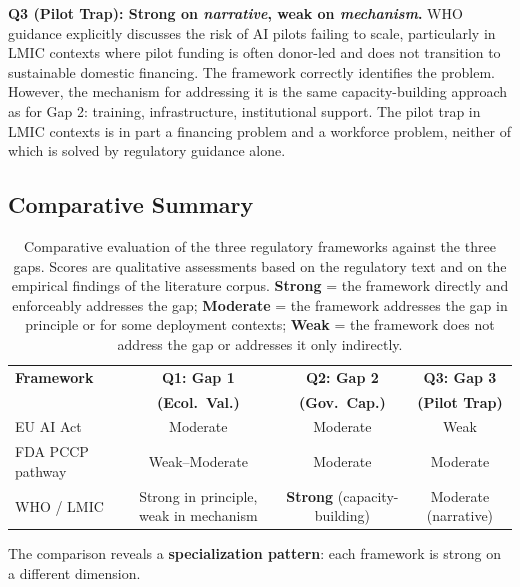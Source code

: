 \noindent\textbf{Q3 (Pilot Trap): Strong on
\textit{narrative}, weak on \textit{mechanism}.}
WHO guidance explicitly discusses the risk of AI pilots
failing to scale, particularly in LMIC contexts where
pilot funding is often donor-led and does not
transition to sustainable domestic financing. The
framework correctly identifies the problem. However, the
mechanism for addressing it is the same capacity-building
approach as for Gap 2: training, infrastructure,
institutional support. The pilot trap in LMIC contexts
is in part a financing problem and a workforce problem,
neither of which is solved by regulatory guidance alone.

\subsection{Comparative Summary}
\label{sec:regulatory_summary}

\begin{table}[t]
  \centering
  \caption{Comparative evaluation of the three regulatory
  frameworks against the three gaps. Scores are qualitative
  assessments based on the regulatory text and on the
  empirical findings of the literature corpus. \textbf{Strong}
  = the framework directly and enforceably addresses the
  gap; \textbf{Moderate} = the framework addresses the gap
  in principle or for some deployment contexts; \textbf{Weak}
  = the framework does not address the gap or addresses it
  only indirectly.}
  \label{tab:regulatory_comparison}
  \begin{tabular}{lccc}
    \toprule
    \textbf{Framework} & \textbf{Q1: Gap 1} & \textbf{Q2: Gap 2} & \textbf{Q3: Gap 3} \\
                       & \textbf{(Ecol.\ Val.)} & \textbf{(Gov.\ Cap.)} & \textbf{(Pilot Trap)} \\
    \midrule
    EU AI Act          & Moderate & Moderate & Weak \\
    FDA PCCP pathway   & Weak--Moderate & Moderate & Moderate \\
    WHO / LMIC         & Strong in principle, weak in mechanism & \textbf{Strong} (capacity-building) & Moderate (narrative) \\
    \bottomrule
  \end{tabular}
\end{table}

The comparison reveals a \textbf{specialization pattern}:
each framework is strong on a different dimension.

